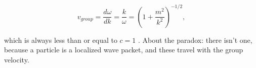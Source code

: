 \begin{equation}
v_{group} = \frac{d\omega}{dk} = \frac{k}{\omega} = \left(1 + \frac{m^2}{ k^2} \right)^{-1/2},
\end{equation}


which  is  always  less  than  or  equal  to   $c =1$ .   About  the  paradox:   there  isn't  one,  because  a  particle  is  a  localized  wave  packet,  and  these  travel  with  the  group  velocity.







